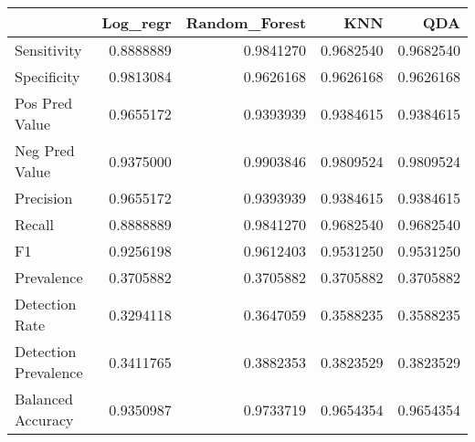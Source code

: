 \documentclass[]{article}
\newenvironment{Shaded}{\begin{snugshade}}{\end{snugshade}}
\newcommand{\KeywordTok}[1]{\textcolor[rgb]{0.13,0.29,0.53}{\textbf{#1}}}
\newcommand{\NormalTok}[1]{#1}
\newcommand{\OperatorTok}[1]{\textcolor[rgb]{0.81,0.36,0.00}{\textbf{#1}}}
\newcommand{\StringTok}[1]{\textcolor[rgb]{0.31,0.60,0.02}{#1}}
\begin{document}
\begin{longtable}[]{@{}lrrrr@{}}
\toprule
& Log\_regr & Random\_Forest & KNN & QDA\tabularnewline
\midrule
\endhead
Sensitivity & 0.8888889 & 0.9841270 & 0.9682540 &
0.9682540\tabularnewline
Specificity & 0.9813084 & 0.9626168 & 0.9626168 &
0.9626168\tabularnewline
Pos Pred Value & 0.9655172 & 0.9393939 & 0.9384615 &
0.9384615\tabularnewline
Neg Pred Value & 0.9375000 & 0.9903846 & 0.9809524 &
0.9809524\tabularnewline
Precision & 0.9655172 & 0.9393939 & 0.9384615 & 0.9384615\tabularnewline
Recall & 0.8888889 & 0.9841270 & 0.9682540 & 0.9682540\tabularnewline
F1 & 0.9256198 & 0.9612403 & 0.9531250 & 0.9531250\tabularnewline
Prevalence & 0.3705882 & 0.3705882 & 0.3705882 &
0.3705882\tabularnewline
Detection Rate & 0.3294118 & 0.3647059 & 0.3588235 &
0.3588235\tabularnewline
Detection Prevalence & 0.3411765 & 0.3882353 & 0.3823529 &
0.3823529\tabularnewline
Balanced Accuracy & 0.9350987 & 0.9733719 & 0.9654354 &
0.9654354\tabularnewline
\bottomrule
\end{longtable}

\begin{Shaded}
\end{Shaded}
\end{document}
